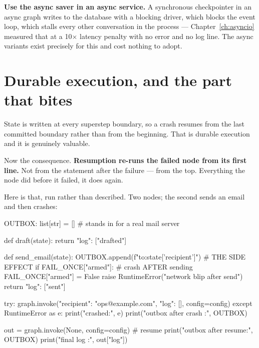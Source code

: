 \begin{warning}
\textbf{Use the async saver in an async service.} A synchronous checkpointer in
an async graph writes to the database with a blocking driver, which blocks the
event loop, which stalls every other conversation in the process ---
Chapter~\ref{ch:asyncio} measured that at a 10$\times$ latency penalty with no
error and no log line. The async variants exist precisely for this and cost
nothing to adopt.
\end{warning}

\section{Durable execution, and the part that bites}
\label{sec:replay-boundary}

State is written at every superstep boundary, so a crash resumes from the last
committed boundary rather than from the beginning. That is durable execution and
it is genuinely valuable.

Now the consequence. \textbf{Resumption re-runs the failed node from its first
line.} Not from the statement after the failure --- from the top. Everything the
node did before it failed, it does again.

Here is that, run rather than described. Two nodes; the second sends an email and
then crashes:

\begin{python}[caption={A node that fails after its side effect}, label={lst:duplicate}]
OUTBOX: list[str] = []          # stands in for a real mail server


def draft(state):
    return {"log": ["drafted"]}


def send_email(state):
    OUTBOX.append(f"to:{state['recipient']}")     # THE SIDE EFFECT
    if FAIL_ONCE["armed"]:                        # crash AFTER sending
        FAIL_ONCE["armed"] = False
        raise RuntimeError("network blip after send")
    return {"log": ["sent"]}


try:
    graph.invoke({"recipient": "ops@example.com", "log": []}, config=config)
except RuntimeError as e:
    print("crashed:", e)
print("outbox after crash :", OUTBOX)

out = graph.invoke(None, config=config)           # resume
print("outbox after resume:", OUTBOX)
print("final log          :", out["log"])
\end{python}

